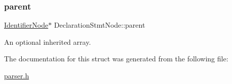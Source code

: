 \subsubsection{\texorpdfstring{parent}{parent}}
{\footnotesize\ttfamily \hyperlink{parser_8h_a930727769b8a8eb0d24d474f3aa12a43}{Identifier\+Node}$\ast$ Declaration\+Stmt\+Node\+::parent}

An optional inherited array. 

The documentation for this struct was generated from the following file\+:\begin{DoxyCompactItemize}
\item 
\hyperlink{parser_8h}{parser.\+h}\end{DoxyCompactItemize}
